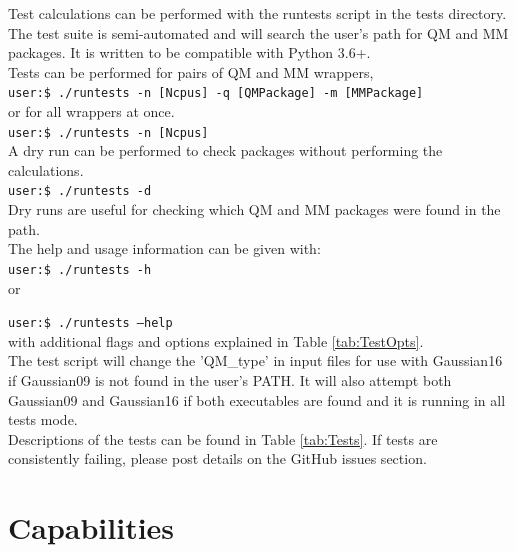 \documentclass[12pt]{report}
\begin{document}
Test calculations can be performed with the runtests script in the tests
directory.
The test suite is semi-automated and will search the user's path for QM and
MM packages.
It is written to be compatible with Python 3.6+. \\

Tests can be performed for pairs of QM and MM wrappers, \\

\texttt{user:\$ ./runtests -n [Ncpus] -q [QMPackage] -m [MMPackage]} \\

or for all wrappers at once. \\

\texttt{user:\$ ./runtests -n [Ncpus]} \\

A dry run can be performed to check packages without performing the
calculations. \\

\texttt{user:\$ ./runtests -d} \\

Dry runs are useful for checking which QM and MM packages were found in the
path. \\

The help and usage information can be given with: \\

\texttt{user:\$ ./runtests -h} \\

or

\texttt{user:\$ ./runtests --help} \\

with additional flags and options explained in Table \ref{tab:TestOpts}. \\

The test script will change the 'QM_type' in input files for use with
Gaussian16 if Gaussian09 is not found in the user's PATH.
It will also attempt both Gaussian09 and Gaussian16 if both executables are
found and it is running in all tests mode. \\

Descriptions of the tests can be found in Table \ref{tab:Tests}.
If tests are consistently failing, please post details on the GitHub issues
section.

\section{Capabilities}
\end{document}
